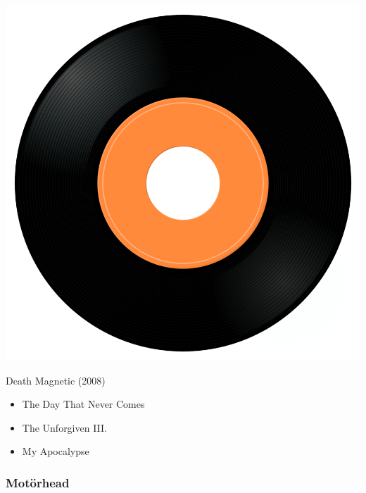 \begin{minipage}[t]{0.25\textwidth}
\captionsetup{type=figure}
\includegraphics[width=\textwidth]{Images/cover.png}
\caption*{Death Magnetic (2008)}
\end{minipage}
\begin{minipage}[t]{0.25\textwidth}\vspace{0pt}
\begin{itemize}[nosep,leftmargin=1em,labelwidth=*,align=left]
	\setlength{\itemsep}{0pt}
	\item The Day That Never Comes
	\item The Unforgiven III.
	\item My Apocalypse
\end{itemize}
\end{minipage}


\subsubsection{Motörhead}

